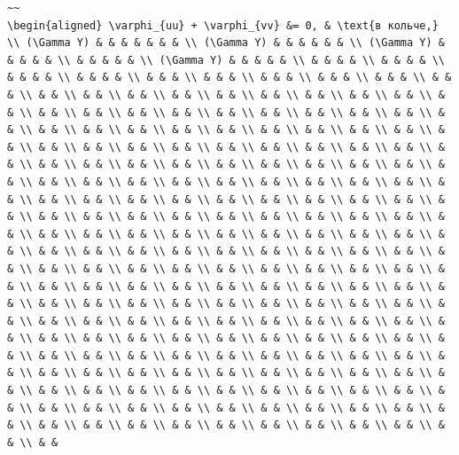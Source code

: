 \documentclass[
  ukrainian,
]{article}
\begin{document}
\begin{verbatim}
~~
\begin{aligned} \varphi_{uu} + \varphi_{vv} &= 0, & \text{в кольче,} \\ (\Gamma Y) & & & & & & & \\ (\Gamma Y) & & & & & & \\ (\Gamma Y) & & & & & \\ & & & & & \\ (\Gamma Y) & & & & & \\ & & & & \\ & & & & \\ & & & & \\ & & & & \\ & & & \\ & & & \\ & & & \\ & & & \\ & & & \\ & & & \\ & & \\ & & \\ & & \\ & & \\ & & \\ & & \\ & & \\ & & \\ & & \\ & & \\ & & \\ & & \\ & & \\ & & \\ & & \\ & & \\ & & \\ & & \\ & & \\ & & \\ & & \\ & & \\ & & \\ & & \\ & & \\ & & \\ & & \\ & & \\ & & \\ & & \\ & & \\ & & \\ & & \\ & & \\ & & \\ & & \\ & & \\ & & \\ & & \\ & & \\ & & \\ & & \\ & & \\ & & \\ & & \\ & & \\ & & \\ & & \\ & & \\ & & \\ & & \\ & & \\ & & \\ & & \\ & & \\ & & \\ & & \\ & & \\ & & \\ & & \\ & & \\ & & \\ & & \\ & & \\ & & \\ & & \\ & & \\ & & \\ & & \\ & & \\ & & \\ & & \\ & & \\ & & \\ & & \\ & & \\ & & \\ & & \\ & & \\ & & \\ & & \\ & & \\ & & \\ & & \\ & & \\ & & \\ & & \\ & & \\ & & \\ & & \\ & & \\ & & \\ & & \\ & & \\ & & \\ & & \\ & & \\ & & \\ & & \\ & & \\ & & \\ & & \\ & & \\ & & \\ & & \\ & & \\ & & \\ & & \\ & & \\ & & \\ & & \\ & & \\ & & \\ & & \\ & & \\ & & \\ & & \\ & & \\ & & \\ & & \\ & & \\ & & \\ & & \\ & & \\ & & \\ & & \\ & & \\ & & \\ & & \\ & & \\ & & \\ & & \\ & & \\ & & \\ & & \\ & & \\ & & \\ & & \\ & & \\ & & \\ & & \\ & & \\ & & \\ & & \\ & & \\ & & \\ & & \\ & & \\ & & \\ & & \\ & & \\ & & \\ & & \\ & & \\ & & \\ & & \\ & & \\ & & \\ & & \\ & & \\ & & \\ & & \\ & & \\ & & \\ & & \\ & & \\ & & \\ & & \\ & & \\ & & \\ & & \\ & & \\ & & \\ & & \\ & & \\ & & \\ & & \\ & & \\ & & \\ & & \\ & & \\ & & \\ & & \\ & & \\ & & \\ & & \\ & & \\ & & \\ & & \\ & & \\ & & \\ & & \\ & & \\ & & \\ & & \\ & & \\ & & \\ & & \\ & & \\ & & \\ & &
\end{verbatim}
\end{document}
